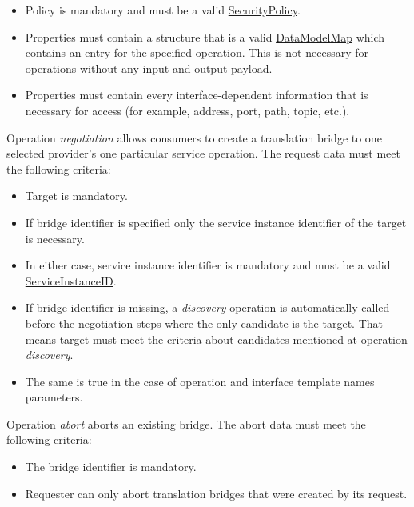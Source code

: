 \documentclass[a4paper]{arrowhead}
\newcommand{\pref}[1]{{\textcolor{ArrowheadGrey}{\hyperref[sec:model:primitives:#1]{#1}}}}
\begin{document}
\begin{itemize}
\begin{itemize}
\begin{itemize}
            \item Policy is mandatory and must be a valid \pref{SecurityPolicy}.
            \item Properties must contain a structure that is a valid \hyperref[sec:model:DataModelMap]{DataModelMap} which contains an entry for the specified operation. This is not necessary for operations without any input and output payload.
            \item Properties must contain every interface-dependent information that is necessary for access (for example, address, port, path, topic, etc.).
        \end{itemize}
    \end{itemize}
\end{itemize}


Operation \textit{negotiation} allows consumers to create a translation bridge to one selected provider's one particular service operation. The request data must meet the following criteria:

\begin{itemize}
    \item Target is mandatory.
    \item If bridge identifier is specified only the service instance identifier of the target is necessary.
    \item In either case, service instance identifier is mandatory and  must be a valid \pref{ServiceInstanceID}.
    \item If bridge identifier is missing, a \textit{discovery} operation is automatically called before the negotiation steps where the only candidate is the target. That means target must meet the criteria about candidates mentioned at operation \textit{discovery}. 
    \item The same is true in the case of operation and interface template names parameters.
\end{itemize}


Operation \textit{abort} aborts an existing bridge. The abort data must meet the following criteria:

\begin{itemize}
    \item The bridge identifier is mandatory.
    \item Requester can only abort translation bridges that were created by its request.
\end{itemize}
\end{document}
